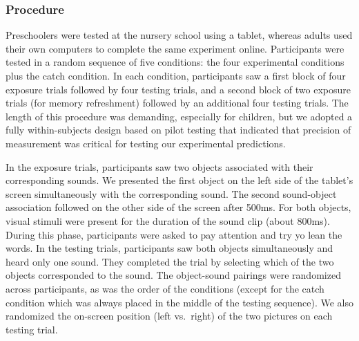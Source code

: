 \documentclass[english,,man]{apa6}
\begin{document}
\hypertarget{procedure}{%
\subsubsection{Procedure}\label{procedure}}

Preschoolers were tested at the nursery school using a tablet, whereas adults used their own computers to complete the same experiment online. Participants were tested in a random sequence of five conditions: the four experimental conditions plus the catch condition. In each condition, participants saw a first block of four exposure trials followed by four testing trials, and a second block of two exposure trials (for memory refreshment) followed by an additional four testing trials. The length of this procedure was demanding, especially for children, but we adopted a fully within-subjects design based on pilot testing that indicated that precision of measurement was critical for testing our experimental predictions.

In the exposure trials, participants saw two objects associated with their corresponding sounds. We presented the first object on the left side of the tablet's screen simultaneously with the corresponding sound. The second sound-object association followed on the other side of the screen after 500ms. For both objects, visual stimuli were present for the duration of the sound clip (about 800ms). During this phase, participants were asked to pay attention and try yo lean the words. In the testing trials, participants saw both objects simultaneously and heard only one sound. They completed the trial by selecting which of the two objects corresponded to the sound. The object-sound pairings were randomized across participants, as was the order of the conditions (except for the catch condition which was always placed in the middle of the testing sequence). We also randomized the on-screen position (left vs.~right) of the two pictures on each testing trial.
\end{document}
